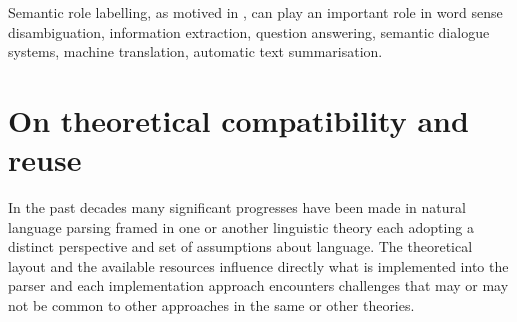 %
%

Semantic role labelling, as motived in \citep[246]{gildea2002automatic}, can play an important role in word sense disambiguation, information extraction, question answering, semantic dialogue systems, machine translation, automatic text summarisation.


%


\section{On theoretical compatibility and reuse}
\label{sec:reuse}
In the past decades many significant progresses have been made in natural language parsing framed in one or another linguistic theory each adopting a distinct perspective and set of assumptions about language. The theoretical layout and the available resources influence directly what is implemented into the parser and each implementation approach encounters challenges that may or may not be common to other approaches in the same or other theories. 

